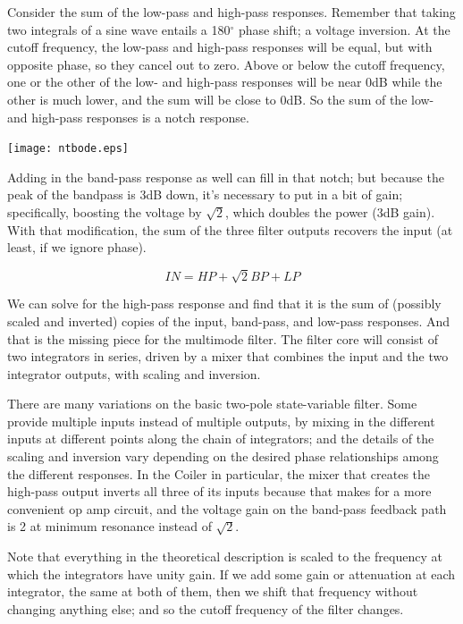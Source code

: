 Consider the sum of the low-pass and high-pass responses.  Remember that
taking two integrals of a sine wave entails a 180$^\circ$ phase shift; a
voltage inversion.  At the cutoff frequency, the low-pass and high-pass
responses will be equal, but with opposite phase, so they cancel out to
zero.  Above or below the cutoff frequency, one or the other of the low- and
high-pass responses will be near 0dB while the other is much lower, and the
sum will be close to 0dB.  So the sum of the low- and high-pass responses is
a notch response.

\nopagebreak
{\centering\texttt{[image: ntbode.eps]}\par}

Adding in the band-pass response as well can fill in that notch; but because
the peak of the bandpass is 3dB down, it's necessary to put in a bit of
gain; specifically, boosting the voltage by $\sqrt{2}$, which doubles the
power (3dB gain).  With that modification, the sum of the three filter
outputs recovers the input (at least, if we ignore phase).

\begin{equation*}
   \textit{IN} = \textit{HP} + \sqrt{2}\textit{BP} + \textit{LP}
\end{equation*}

We can solve for the high-pass response and find that it is the sum of
(possibly scaled and inverted) copies of the input, band-pass, and low-pass
responses.  And that is the missing piece for the multimode filter.  The
filter core will consist of two integrators in series, driven by a mixer
that combines the input and the two integrator outputs, with scaling and
inversion.

\vspace{0.5\baselineskip}
{\centering\par}

There are many variations on the basic two-pole state-variable filter.  Some
provide multiple inputs instead of multiple outputs, by mixing in the
different inputs at different points along the chain of integrators; and the
details of the scaling and inversion vary depending on the desired phase
relationships among the different responses.  In the Coiler in particular,
the mixer that creates the high-pass output inverts all three of its inputs
because that makes for a more convenient op amp circuit, and the voltage
gain on the band-pass feedback path is 2 at minimum resonance instead of
$\sqrt{2}$.

Note that everything in the theoretical description is scaled to the
frequency at which the integrators have unity gain.  If we add some gain or
attenuation at each integrator, the same at both of them, then we shift that
frequency without changing anything else; and so the cutoff frequency of the
filter changes.

